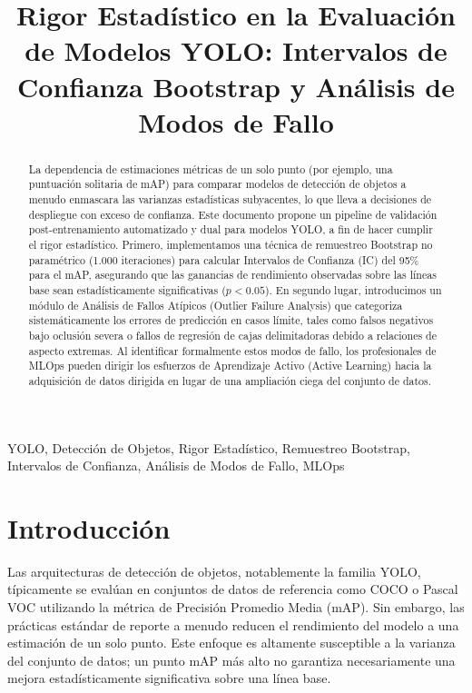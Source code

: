 \documentclass[conference]{IEEEtran}
\begin{document}
\title{Rigor Estadístico en la Evaluación de Modelos YOLO: Intervalos de Confianza Bootstrap y Análisis de Modos de Fallo}

\author{
}

\maketitle

\begin{abstract}
La dependencia de estimaciones métricas de un solo punto (por ejemplo, una puntuación solitaria de mAP) para comparar modelos de detección de objetos a menudo enmascara las varianzas estadísticas subyacentes, lo que lleva a decisiones de despliegue con exceso de confianza. Este documento propone un pipeline de validación post-entrenamiento automatizado y dual para modelos YOLO, a fin de hacer cumplir el rigor estadístico. Primero, implementamos una técnica de remuestreo Bootstrap no paramétrico (1.000 iteraciones) para calcular Intervalos de Confianza (IC) del 95\% para el mAP, asegurando que las ganancias de rendimiento observadas sobre las líneas base sean estadísticamente significativas ($p < 0.05$). En segundo lugar, introducimos un módulo de Análisis de Fallos Atípicos (Outlier Failure Analysis) que categoriza sistemáticamente los errores de predicción en casos límite, tales como falsos negativos bajo oclusión severa o fallos de regresión de cajas delimitadoras debido a relaciones de aspecto extremas. Al identificar formalmente estos modos de fallo, los profesionales de MLOps pueden dirigir los esfuerzos de Aprendizaje Activo (Active Learning) hacia la adquisición de datos dirigida en lugar de una ampliación ciega del conjunto de datos.
\end{abstract}

\begin{IEEEkeywords}
YOLO, Detección de Objetos, Rigor Estadístico, Remuestreo Bootstrap, Intervalos de Confianza, Análisis de Modos de Fallo, MLOps
\end{IEEEkeywords}

\section{Introducción}
Las arquitecturas de detección de objetos, notablemente la familia YOLO, típicamente se evalúan en conjuntos de datos de referencia como COCO o Pascal VOC utilizando la métrica de Precisión Promedio Media (mAP). Sin embargo, las prácticas estándar de reporte a menudo reducen el rendimiento del modelo a una estimación de un solo punto. Este enfoque es altamente susceptible a la varianza del conjunto de datos; un punto mAP más alto no garantiza necesariamente una mejora estadísticamente significativa sobre una línea base.
\end{document}
